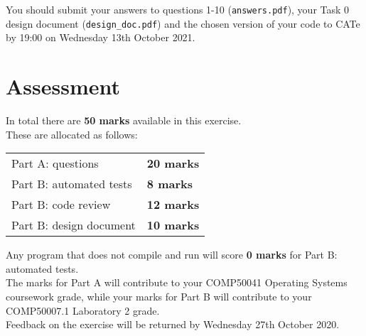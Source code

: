 \documentclass[a4paper,12pt]{article}
\newcommand{\shell}[1]{\lstinline!#1!}
\begin{document}
You should submit your answers to questions 1-10 (\shell{answers.pdf}), your Task 0 design document (\shell{design_doc.pdf}) and the chosen version of your code to CATe by 19:00 on Wednesday 13th October 2021.\\


\section*{Assessment}
In total there are {\bf 50 marks} available in this exercise.\\
These are allocated as follows:
%
\begin{center}
\begin{tabular}{l@{\qquad\qquad}l}
  Part A: questions       & {\bf 20 marks} \\
  Part B: automated tests & {\bf 8 marks} \\
  Part B: code review     & {\bf 12 marks} \\
  Part B: design document & {\bf 10 marks} \\    
\end{tabular}
\end{center}
%
Any program that does not compile and run will score {\bf 0 marks} for Part B: automated tests.\\[-0.8em]

\noindent The marks for Part A will contribute to your COMP50041 Operating Systems coursework grade,
while your marks for Part B will contribute to your COMP50007.1 Laboratory 2 grade.\\[-0.8em]


\noindent Feedback on the exercise will be returned by Wednesday 27th October 2020.


\end{document}
